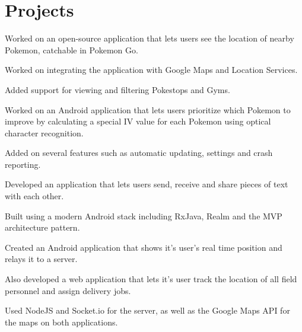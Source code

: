 \documentclass[]{deedy-resume-openfont}
\begin{document}
\begin{minipage}[t]{0.48\textwidth} 


\section{Projects}

\vspace{\topsep}
\begin{tightemize}
\item Worked on an open-source application that lets users see the location of nearby Pokemon, catchable in Pokemon Go.
\item Worked on integrating the application with Google Maps and Location Services.
\item Added support for viewing and filtering Pokestops and Gyms.
\end{tightemize}
\sectionsep

\begin{tightemize}
\item Worked on an Android application that lets users prioritize which Pokemon to improve by calculating a special IV value for each Pokemon using optical character recognition.
\item Added on several features such as automatic updating, settings and crash reporting.
\end{tightemize}
\sectionsep

\begin{tightemize}
\item Developed an application that lets users send, receive and share pieces of text with each other.
\item Built using a modern Android stack including RxJava, Realm and the MVP architecture pattern.
\end{tightemize}
\sectionsep

\begin{tightemize}
\item Created an Android application that shows it's user's real time position and relays it to a server.
\item Also developed a web application that lets it's user track the location of all field personnel and assign delivery jobs.
\item Used NodeJS and Socket.io for the server, as well as the Google Maps API for the maps on both applications.
\end{tightemize}
\sectionsep


\end{minipage}
\end{document}

